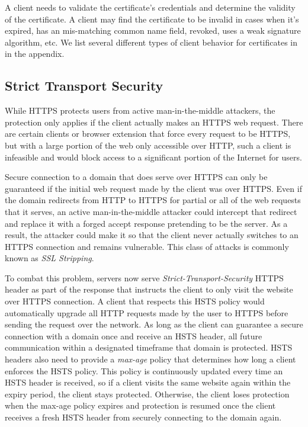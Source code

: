A client needs to validate the certificate's credentials and determine the
validity of the certificate. A client may find the certificate to be invalid in
cases when it's expired, has an mis-matching common name field, revoked, uses a
weak signature algorithm, etc. We list several different types of client
behavior for certificates in  in the appendix.

\subsection{Strict Transport Security}
While HTTPS protects users from active man-in-the-middle attackers, the
protection only applies if the client actually makes an HTTPS web request.
There are certain clients or browser extension that force every request to be
HTTPS, but with a large portion of the web only accessible over HTTP, such a
client is infeasible and would block access to a significant portion of the
Internet for users.

Secure connection to a domain that does serve over HTTPS can only be guaranteed
if the initial web request made by the client was over HTTPS. Even if the
domain redirects from HTTP to HTTPS for partial or all of the web requests
that it serves, an active man-in-the-middle attacker could intercept that
redirect and replace it with a forged accept response pretending to be the
server. As a result, the attacker could make it so that the client never
actually switches to an HTTPS connection and remains vulnerable. This class of
attacks is commonly known as \emph{SSL Stripping}\cite{sslstrip}.

To combat this problem, servers now serve \emph{Strict-Transport-Security}
HTTPS header as part of the response that instructs the client to only visit
the website over HTTPS connection\cite{RFC6797}. A client that respects this
HSTS policy would automatically upgrade all HTTP requests made by the user to
HTTPS before sending the request over the network. As long as the client can
guarantee a secure connection with a domain once and receive an HSTS header,
all future communication within a designated timeframe that domain is
protected. HSTS headers also need to provide a \emph{max-age} policy that
determines how long a client enforces the HSTS policy. This policy is
continuously updated every time an HSTS header is received, so if a client
visits the same website again within the expiry period, the client stays
protected. Otherwise, the client loses protection when the max-age policy
expires and protection is resumed once the client receives a fresh HSTS header
from securely connecting to the domain again.

